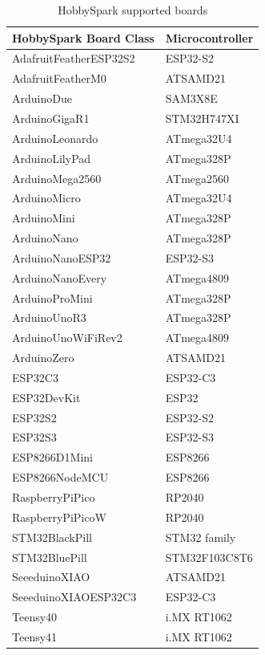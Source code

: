 \begin{table}[H]
\centering
\caption{HobbySpark supported boards}
\label{tab:all-supported-boards}
\begin{tabular}{ll}
\toprule
\textbf{HobbySpark Board Class} & \textbf{Microcontroller} \\
\midrule
AdafruitFeatherESP32S2 & ESP32-S2 \\
AdafruitFeatherM0 & ATSAMD21 \\
ArduinoDue & SAM3X8E \\
ArduinoGigaR1 & STM32H747XI \\
ArduinoLeonardo & ATmega32U4 \\
ArduinoLilyPad & ATmega328P \\
ArduinoMega2560 & ATmega2560 \\
ArduinoMicro & ATmega32U4 \\
ArduinoMini & ATmega328P \\
ArduinoNano & ATmega328P \\
ArduinoNanoESP32 & ESP32-S3 \\
ArduinoNanoEvery & ATmega4809 \\
ArduinoProMini & ATmega328P \\
ArduinoUnoR3 & ATmega328P \\
ArduinoUnoWiFiRev2 & ATmega4809 \\
ArduinoZero & ATSAMD21 \\
ESP32C3 & ESP32-C3 \\
ESP32DevKit & ESP32 \\
ESP32S2 & ESP32-S2 \\
ESP32S3 & ESP32-S3 \\
ESP8266D1Mini & ESP8266 \\
ESP8266NodeMCU & ESP8266 \\
RaspberryPiPico & RP2040 \\
RaspberryPiPicoW & RP2040 \\
STM32BlackPill & STM32 family \\
STM32BluePill & STM32F103C8T6 \\
SeeeduinoXIAO & ATSAMD21 \\
SeeeduinoXIAOESP32C3 & ESP32-C3 \\
Teensy40 & i.MX RT1062 \\
Teensy41 & i.MX RT1062 \\
\bottomrule
\end{tabular}
\end{table}